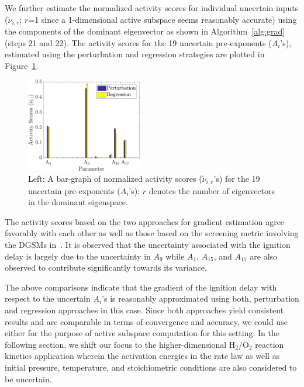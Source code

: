 We further estimate
the normalized activity scores for individual uncertain inputs ($\tilde{\nu}_{i,r}$; $r$=1 since a
1-dimensional active subspace seems reasonably accurate)
using the components of the dominant eigenvector as shown in Algorithm~\ref{alg:grad} (steps 21 and 22).
The activity scores for the 19 uncertain pre-exponents ($A_i$'s), estimated
using the perturbation and regression strategies are plotted in Figure~\ref{fig:comp_as}.  
%
\begin{figure}[htbp]
 \begin{center}
  \includegraphics[width=0.45\textwidth]{comp_as19D}
\caption{Left: A bar-graph of normalized activity scores ($\tilde{\nu}_{i,r}$'s) 
for the 19 uncertain pre-exponents ($A_i$'s); $r$
denotes the number of eigenvectors in the dominant eigenspace.}
\label{fig:comp_as}
\end{center}
\end{figure}
%
The activity scores based on the two approaches for gradient estimation agree favorably 
with each other as well as those
based on the screening metric involving the DGSMs in~\cite{Vohra:2018}. It is observed that the uncertainty
associated with the ignition delay is largely due to the uncertainty in $A_9$ while $A_1$, $A_{15}$, and
$A_{17}$ are also observed to contribute significantly towards its variance.

The above comparisons indicate that the gradient of the ignition delay with respect to the
uncertain $A_i$'s is reasonably approximated using both, perturbation  and regression 
approaches in this case. Since both approaches yield consistent results and are
comparable in terms of convergence and accuracy, we could use either for the purpose
of active subspace computation for this setting.
In the following section, we shift our focus to 
the higher-dimensional H$_2$/O$_2$ reaction kinetics application wherein the activation
energies in the rate law as well as initial pressure, temperature, and stoichiometric conditions
are also considered to be uncertain.
